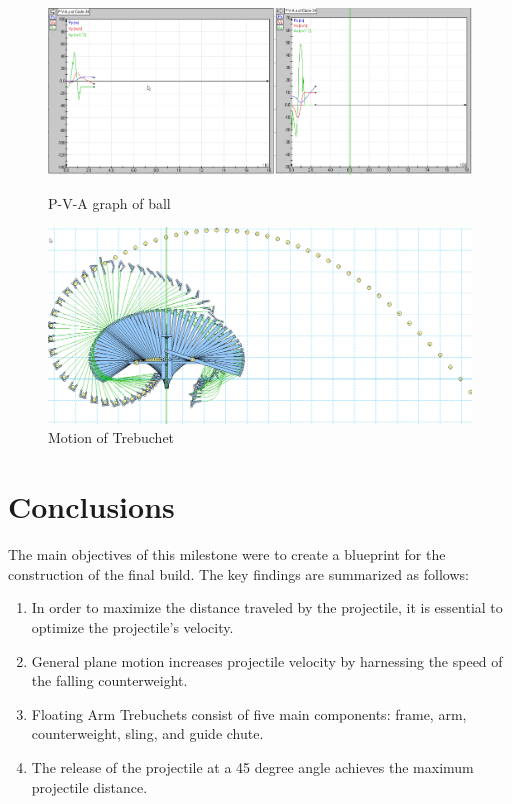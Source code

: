 \documentclass[12pt, titlepage]{article}
\begin{document}
\begin{figure}[b]
    \begin{minipage}[t]{0.49\textwidth}
        \vspace{12pt}
        \begin{flushleft}
            \includegraphics[width=\textwidth]{Graphs.png}
        \end{flushleft}
        \caption{P-V-A graph of ball\label{graphs}}
    \end{minipage}
    \hfill
    \begin{minipage}[t]{0.49\textwidth}
        \vspace{0pt}
        \begin{flushright}
            \includegraphics[width=\textwidth]{Motion.png}
        \end{flushright}
        \caption{Motion of Trebuchet\label{motion}}
    \end{minipage}
\end{figure}

    \newpage
    \section{Conclusions}
    The main objectives of this milestone were to create a blueprint for 
    the construction of the final build.
    The key findings are summarized as follows:
    \begin{enumerate}
        \item In order to maximize the distance traveled by the projectile, it is essential to optimize the projectile's velocity. 
        \item General plane motion increases projectile velocity by harnessing the speed of the falling counterweight.    
        \item Floating Arm Trebuchets consist of five main components: 
            frame, arm, counterweight, sling, and guide chute.
        \item The release of the projectile at a 45 degree angle achieves the 
            maximum projectile distance.
    \end{enumerate}
    \newpage
\end{document}
